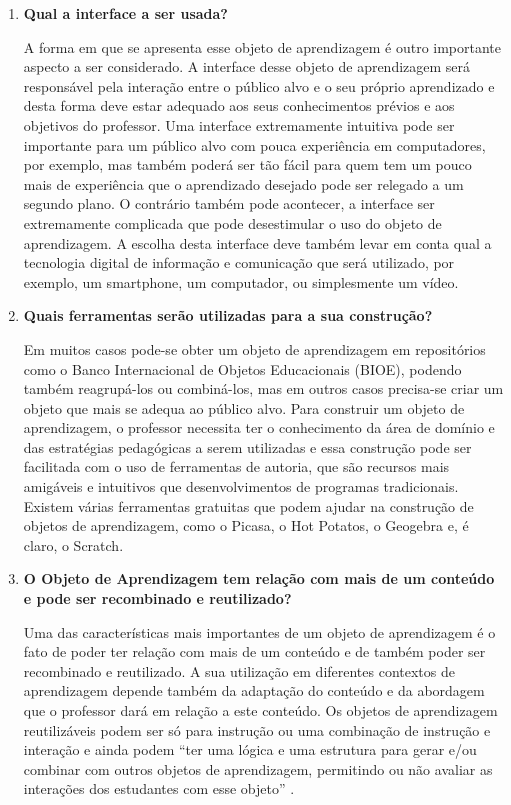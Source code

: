 \documentclass[12pt, openright, a4paper, brazil, english, french, spanish, bibjustif, openany, oneside]{abntex2}
\begin{document}
\begin{enumerate}[label=\textbf{\alph*)}]
\item \textbf{Qual a interface a ser usada?}

A forma em que se apresenta esse objeto de aprendizagem é outro importante aspecto a ser considerado. A interface desse objeto de aprendizagem será responsável pela interação entre o público alvo e o seu próprio aprendizado e desta forma deve estar adequado aos seus conhecimentos prévios e aos objetivos do professor. Uma interface extremamente intuitiva pode ser importante para um público alvo com pouca experiência em computadores, por exemplo, mas também poderá ser tão fácil para quem tem um pouco mais de experiência que o aprendizado desejado pode ser relegado a um segundo plano. O contrário também pode acontecer, a interface ser extremamente complicada que pode desestimular o uso do objeto de aprendizagem. A escolha desta interface deve também levar em conta qual a tecnologia digital de informação e comunicação que será utilizado, por exemplo, um smartphone, um computador, ou simplesmente um vídeo.

\item \textbf{Quais ferramentas serão utilizadas para a sua construção?}

Em muitos casos pode-se obter um objeto de aprendizagem em repositórios como o Banco Internacional de Objetos Educacionais (BIOE), podendo também reagrupá-los ou  combiná-los, mas em outros casos precisa-se criar um objeto que mais se adequa ao público alvo. Para construir um objeto de aprendizagem, o professor necessita ter o conhecimento da área de domínio e das estratégias pedagógicas a serem utilizadas e essa construção pode ser facilitada com o uso de ferramentas de autoria, que são recursos mais amigáveis e intuitivos que desenvolvimentos de programas tradicionais. Existem várias ferramentas gratuitas que podem ajudar na construção de objetos de aprendizagem, como o Picasa, o Hot Potatos, o Geogebra e, é claro, o Scratch.

\item \textbf{O Objeto de Aprendizagem tem relação com mais de um conteúdo e pode ser recombinado e reutilizado?} 

Uma das características mais importantes de um objeto de aprendizagem é o fato de poder ter relação com mais de um conteúdo e de também poder ser recombinado e reutilizado. A sua utilização em diferentes contextos de aprendizagem depende também da adaptação do conteúdo e da abordagem que o professor dará em relação a este conteúdo. Os objetos de aprendizagem reutilizáveis podem ser só para instrução ou uma combinação de instrução e interação e ainda podem ``ter uma lógica e uma estrutura para gerar e/ou combinar com outros objetos de aprendizagem, permitindo ou não avaliar as interações dos estudantes com esse objeto'' \cite{tarouco}.

\end{enumerate}
\end{document}
